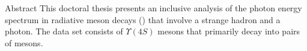 \begin{abstractpage}{Abstract}
    This doctoral thesis presents an inclusive analysis of the photon energy spectrum in radiative \B meson decays (\BtoXsgamma) that involve a strange hadron and a photon.
    The data set consists of $\Upsilon(4S)$ mesons that primarily decay into pairs of \B mesons.

\end{abstractpage}
